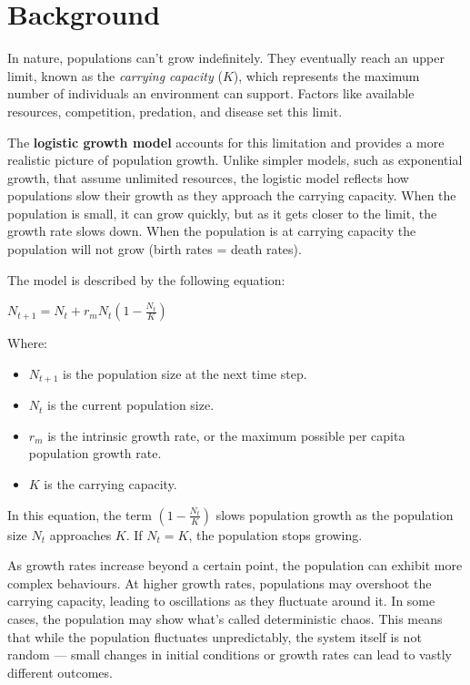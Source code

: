 \documentclass[
  a4paper]{book}
\providecommand{\tightlist}{%
  \setlength{\itemsep}{0pt}\setlength{\parskip}{0pt}}
\begin{document}
\section{Background}\label{background-5}

In nature, populations can't grow indefinitely. They eventually reach an upper limit, known as the \emph{carrying capacity} (\(K\)), which represents the maximum number of individuals an environment can support. Factors like available resources, competition, predation, and disease set this limit.

The \textbf{logistic growth model} accounts for this limitation and provides a more realistic picture of population growth. Unlike simpler models, such as exponential growth, that assume unlimited resources, the logistic model reflects how populations slow their growth as they approach the carrying capacity. When the population is small, it can grow quickly, but as it gets closer to the limit, the growth rate slows down. When the population is at carrying capacity the population will not grow (birth rates = death rates).

The model is described by the following equation:

\(N_{t+1} = N_{t} + r_{m} N_{t} \left(1 - \frac{N_{t}}{K}\right)\)

Where:

\begin{itemize}
\tightlist
\item
  \(N_{t+1}\) is the population size at the next time step.
\item
  \(N_t\) is the current population size.
\item
  \(r_m\) is the intrinsic growth rate, or the maximum possible per capita population growth rate.
\item
  \(K\) is the carrying capacity.
\end{itemize}

In this equation, the term \(\left(1 - \frac{N_t}{K}\right)\) slows population growth as the population size \(N_t\) approaches \(K\). If \(N_t = K\), the population stops growing.

As growth rates increase beyond a certain point, the population can exhibit more complex behaviours. At higher growth rates, populations may overshoot the carrying capacity, leading to oscillations as they fluctuate around it. In some cases, the population may show what's called deterministic chaos. This means that while the population fluctuates unpredictably, the system itself is not random --- small changes in initial conditions or growth rates can lead to vastly different outcomes.
\end{document}
